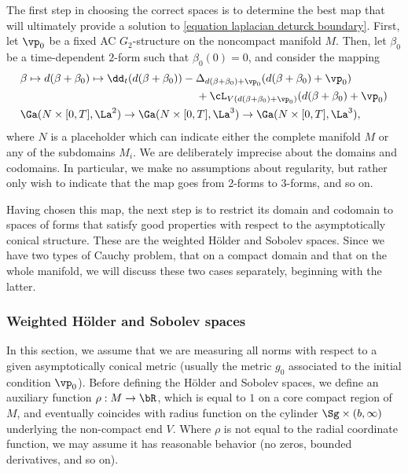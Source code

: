 \documentclass[hidelinks, 12pt, oneside, reqno]{amsart}
\begin{document}
The first step in choosing the correct spaces is to determine the best map that will ultimately provide a solution to \eqref{equation laplacian deturck boundary}. First, let $\vp_0$ be a fixed AC $G_2$-structure on the noncompact manifold $M$. Then, let $\beta_0$ be a time-dependent $2$-form such that $\beta_0(0) =0$, and consider the mapping
\begin{align}\label{equation the rough mapping}
    &\beta \mapsto d (\beta + \beta_0)  \mapsto \dd_t (d (\beta + \beta_0)) - \Delta_{d (\beta + \beta_0)+\vp_0} (d (\beta + \beta_0) + \vp_0) \nonumber \\
    & \qquad \qquad \qquad \qquad \qquad \qquad \qquad \qquad + \cL_{V(d (\beta + \beta_0) + \vp_0)} (d (\beta + \beta_0) + \vp_0) \\
    &\Ga(N \times [0,T], \La^2) \rightarrow \Ga(N \times [0,T], \La^3)
    \rightarrow \Ga(N \times [0,T], \La^3), \nonumber
\end{align}
where $N$ is a placeholder which can indicate either the complete manifold $M$ or any of the subdomains $M_i$. We are deliberately imprecise about the domains and codomains. In particular, we make no assumptions about regularity, but rather only wish to indicate that the map goes from 2-forms to 3-forms, and so on. 

Having chosen this map, the next step is to restrict its domain and codomain to spaces of forms that satisfy good properties with respect to the asymptotically conical structure. These are the weighted H\"older and Sobolev spaces. Since we have two types of Cauchy problem, that on a compact domain and that on the whole manifold, we will discuss these two cases separately, beginning with the latter. 

\subsubsection{Weighted H\"older and Sobolev spaces} \label{section weighted sobolev holder}
In this section, we assume that we are measuring all norms with respect to a given asymptotically conical metric (usually the metric $g_0$ associated to the initial condition $\vp_0$). Before defining the H\"older and Sobolev spaces, we define an auxiliary function $\rho : M \rightarrow \bR$, which is equal to $1$ on a core compact region of $M$, and eventually coincides with radius function on the cylinder $\Sg \times (b,\infty)$ underlying the non-compact end $V$. Where $\rho$ is not equal to the radial coordinate function, we may assume it has reasonable behavior (no zeros, bounded derivatives, and so on). 
\end{document}
